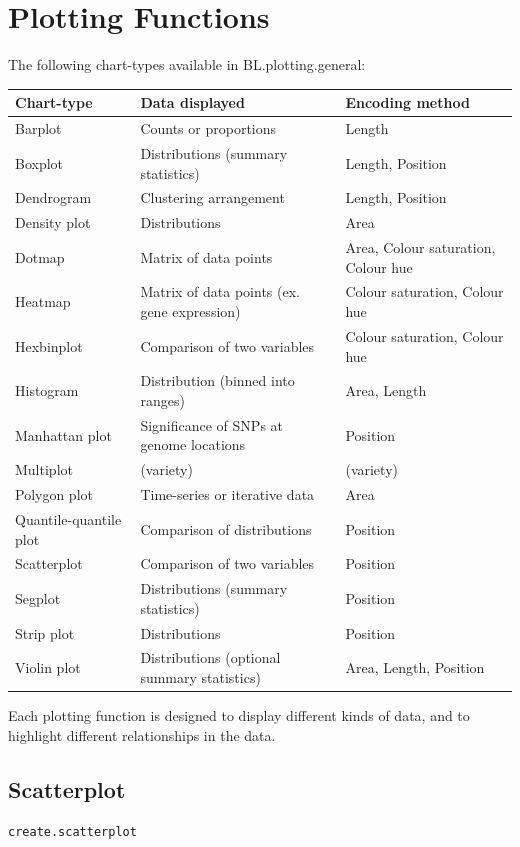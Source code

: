 \documentclass[letterpaper]{article}\usepackage[]{graphicx}\usepackage[]{color}
\begin{document}
\section{Plotting Functions}
The following  chart-types available in BL.plotting.general:

\begin{center}
\begin{tabular}{l  l  l}
\hline
Chart-type & Data displayed & Encoding method\\
\hline
Barplot & Counts or proportions & Length\\
Boxplot & Distributions (summary statistics) & Length, Position\\
Dendrogram & Clustering arrangement & Length, Position \\
Density plot & Distributions & Area \\
Dotmap & Matrix of data points & Area, Colour saturation, Colour hue \\
Heatmap & Matrix of data points (ex. gene expression) & Colour saturation, Colour hue \\
Hexbinplot & Comparison of two variables & Colour saturation, Colour hue \\
Histogram & Distribution (binned into ranges) & Area, Length \\
Manhattan plot & Significance of SNPs at genome locations & Position \\
Multiplot & (variety) & (variety) \\
Polygon plot & Time-series or iterative data & Area \\
Quantile-quantile plot & Comparison of distributions & Position \\
Scatterplot & Comparison of two variables & Position \\
Segplot & Distributions (summary statistics) & Position \\
Strip plot & Distributions & Position \\
Violin plot & Distributions (optional summary statistics) & Area, Length, Position \\
\end{tabular}
\end{center}
\bigskip
Each plotting function is designed to display different kinds of data, and to highlight different relationships in the data. 

\subsection{Scatterplot}
\begin{verbatim}
create.scatterplot
\end{verbatim}
\end{document}
